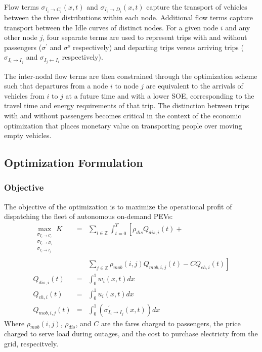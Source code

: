\documentclass[journal]{IEEEtran}
\begin{document}
Flow terms $\sigma_{I_i \rightarrow C_i}(x,t)$ and $\sigma_{I_i \rightarrow D_i}(x,t)$ capture the transport of vehicles between the three distributions within each node. Additional flow terms capture transport between the Idle curves of distinct nodes. For a given node $i$ and any other node $j$, four separate terms are used to represent trips with and without passengers ($\sigma^\prime$ and $\sigma^o$ respectively) and departing trips versus arriving trips ($\sigma_{I_i \rightarrow I_j}$ and $\sigma_{I_j \leftarrow I_i}$ respectively).

The inter-nodal flow terms are then constrained through the optimization scheme such that departures from a node $i$ to node $j$ are equivalent to the arrivals of vehicles from $i$ to $j$ at a future time and with a lower SOE, corresponding to the travel time and energy requirements of that trip. The distinction between trips with and without passengers becomes critical in the context of the economic optimization that places monetary value on transporting people over moving empty vehicles.

\subsection{Optimization Formulation}

\subsubsection{Objective}
The objective of the optimization is to maximize the operational profit of dispatching the fleet of autonomous on-demand PEVs:
\begin{eqnarray*}
  \max_{\substack{\sigma_{I_i \rightarrow C_i} \\
    \sigma_{I_i \rightarrow D_i} \\ 
    \sigma_{I_i \rightarrow I_j}}}
    K &=& \sum_{i\in\mathbb{Z}} \int_{t=0}^{T} \left[ \rho_{dis} Q_{dis,i}(t) + \right. \\ 
      && \left. \sum_{j\in\mathbb{Z}}\rho_{mob}(i,j)Q_{mob,i,j}(t)  - CQ_{ch,i}(t) \right]\\
    Q_{dis,i}(t) & = & \int_{0}^{1} w_i(x,t) dx \\
    Q_{ch,i}(t) & = & \int_{0}^{1} u_i(x,t) dx \\
    Q_{mob,i,j}(t) & = & \int_{0}^{1}\left( \sigma_{I_i \rightarrow I_j}^\prime(x,t) \right)dx
\end{eqnarray*}
Where $\rho_{mob}(i,j)$, $\rho_{dis}$, and $C$ are the fares charged to passengers, the price charged to serve load during outages, and the cost to purchase electricty from the grid, respecitvely.
\end{document}
